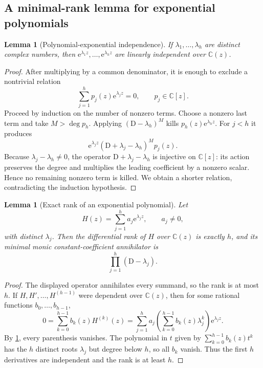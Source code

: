 \documentclass[11pt]{article}
\numberwithin{equation}{section}
\newtheorem{lemma}[theorem]{Lemma}
\theoremstyle{definition}
\theoremstyle{remark}
\newcommand{\C}{\mathbb C}
\newcommand{\e}{\mathrm e}
\newcommand{\D}{\mathrm D}
\begin{document}
\subsection{A minimal-rank lemma for exponential polynomials}

\begin{lemma}[Polynomial-exponential independence]
\label{lem:exp-independence}
If $\lambda_1,\ldots,\lambda_h$ are distinct complex numbers, then
$\e^{\lambda_1z},\ldots,\e^{\lambda_hz}$ are linearly independent over
$\C(z)$.
\end{lemma}
\begin{proof}
After multiplying by a common denominator, it is enough to exclude a nontrivial
relation
\begin{equation}
 \sum_{j=1}^{h}p_j(z)\e^{\lambda_jz}=0,
 \qquad p_j\in\C[z].
 \label{eq:polyexp-relation}
\end{equation}
Proceed by induction on the number of nonzero terms.  Choose a nonzero last
term and take $M>\deg p_h$.  Applying $(\D-\lambda_h)^M$ kills
$p_h(z)\e^{\lambda_hz}$.  For $j<h$ it produces
\[
 \e^{\lambda_jz}(\D+\lambda_j-\lambda_h)^Mp_j(z).
\]
Because $\lambda_j-\lambda_h\ne0$, the operator
$\D+\lambda_j-\lambda_h$ is injective on $\C[z]$: its action preserves the
degree and multiplies the leading coefficient by a nonzero scalar.  Hence no
remaining nonzero term is killed.  We obtain a shorter relation, contradicting
the induction hypothesis.
\end{proof}

\begin{lemma}[Exact rank of an exponential polynomial]
\label{lem:exp-rank}
Let
\[
 H(z)=\sum_{j=1}^{h}a_j\e^{\lambda_jz},
 \qquad a_j\ne0,
\]
with distinct $\lambda_j$.  Then the differential rank of $H$ over $\C(z)$ is
exactly $h$, and its minimal monic constant-coefficient annihilator is
\begin{equation}
 \prod_{j=1}^{h}(\D-\lambda_j).
 \label{eq:min-exp-operator}
\end{equation}
\end{lemma}
\begin{proof}
The displayed operator annihilates every summand, so the rank is at most $h$.
If $H,H',\ldots,H^{(h-1)}$ were dependent over $\C(z)$, then for some rational
functions $b_0,\ldots,b_{h-1}$,
\[
 0=\sum_{k=0}^{h-1}b_k(z)H^{(k)}(z)
  =\sum_{j=1}^{h}a_j
    \left(\sum_{k=0}^{h-1}b_k(z)\lambda_j^k\right)\e^{\lambda_jz}.
\]
By \cref{lem:exp-independence}, every parenthesis vanishes.  The polynomial in
$t$ given by $\sum_{k=0}^{h-1}b_k(z)t^k$ has the $h$ distinct roots
$\lambda_j$ but degree below $h$, so all $b_k$ vanish.  Thus the first $h$
derivatives are independent and the rank is at least $h$.
\end{proof}
\end{document}
